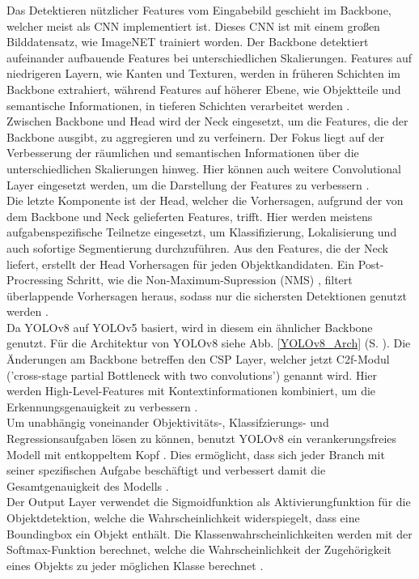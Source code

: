 {{	Das Detektieren nützlicher Features vom Eingabebild geschieht im Backbone, welcher meist als CNN implementiert ist. Dieses CNN ist mit einem großen Bilddatensatz, wie ImageNET trainiert worden. Der Backbone detektiert aufeinander aufbauende Features bei unterschiedlichen Skalierungen. Features auf niedrigeren Layern, wie Kanten und Texturen, werden in früheren Schichten im Backbone extrahiert, während Features auf höherer Ebene, wie Objektteile und semantische Informationen, in tieferen Schichten verarbeitet werden \citep{Terven2023}. \\
	Zwischen Backbone und Head wird der Neck eingesetzt, um die Features, die der Backbone ausgibt, zu aggregieren und zu verfeinern. Der Fokus liegt auf der Verbesserung der räumlichen und semantischen Informationen über die unterschiedlichen Skalierungen hinweg. Hier können auch weitere Convolutional Layer eingesetzt werden, um die Darstellung der Features zu verbessern \citep{Terven2023}. \\
	Die letzte Komponente ist der Head, welcher die Vorhersagen, aufgrund der von dem Backbone und Neck gelieferten Features, trifft. Hier werden meistens aufgabenspezifische Teilnetze eingesetzt, um Klassifizierung, Lokalisierung und auch sofortige Segmentierung durchzuführen. Aus den Features, die der Neck liefert, erstellt der Head Vorhersagen für jeden Objektkandidaten. Ein Post-Procressing Schritt, wie die Non-Maximum-Supression (NMS) , filtert überlappende Vorhersagen heraus, sodass nur die sichersten Detektionen genutzt werden \citep{Terven2023}.\\
	Da YOLOv8 auf YOLOv5 basiert, wird in diesem ein ähnlicher Backbone genutzt. Für die Architektur von YOLOv8 siehe Abb. \ref{YOLOv8_Arch} (S. \pageref{YOLOv8_Arch}). Die Änderungen am Backbone betreffen den CSP Layer, welcher jetzt C2f-Modul ('cross-stage partial Bottleneck with two convolutions') genannt wird. Hier werden High-Level-Features mit Kontextinformationen kombiniert, um die Erkennungsgenauigkeit zu verbessern \citep{Terven2023}. \\
	Um unabhängig voneinander Objektivitäts-, Klassifzierungs- und Regressionsaufgaben lösen zu können, benutzt YOLOv8 ein verankerungsfreies Modell mit entkoppeltem Kopf . Dies ermöglicht, dass sich jeder Branch mit seiner spezifischen Aufgabe beschäftigt und verbessert damit die Gesamtgenauigkeit des Modells \citep{Terven2023}. \\
	Der Output Layer verwendet die Sigmoidfunktion als Aktivierungfunktion für die Objektdetektion, welche die Wahrscheinlichkeit widerspiegelt, dass eine Boundingbox ein Objekt enthält. Die Klassenwahrscheinlichkeiten werden mit der Softmax-Funktion berechnet, welche die Wahrscheinlichkeit der Zugehörigkeit eines Objekts zu jeder möglichen Klasse berechnet \citep{Terven2023}. \\

}}
